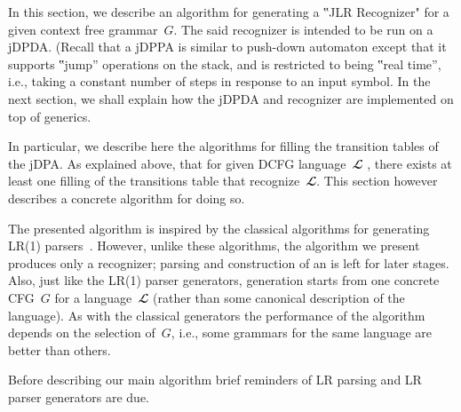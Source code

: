 In this section, we describe an algorithm for generating
  a ‟JLR Recognizer" for a given context free grammar~$G$.
The said recognizer is intended to be run on a jDPDA.
(Recall that a jDPPA is similar to push-down automaton except that it supports 
  ‟jump” operations on the stack, and is restricted to being ‟real time”, i.e.,
  taking a constant number of steps in response
  to an input symbol.
In the next section, we shall explain how the jDPDA and
  recognizer are implemented on top of \Java generics.

In particular, we describe here the algorithms for filling
  the transition tables of the jDPA.
As explained above, that for given DCFG language~$𝓛$ ,
  there exists at least one filling of the transitions table
  that recognize~$𝓛$.
This section however describes a concrete algorithm for
doing so. 

The presented algorithm is inspired by the classical algorithms for generating
  LR(1) parsers~\cite{family1,family2....}.
However, unlike these algorithms, the algorithm we present
  produces only a recognizer; parsing and construction of an \AST
  is left for later stages.
Also, just like the LR(1) parser generators, generation starts from
  one concrete CFG~$G$ for a language~$𝓛$
  (rather than some canonical description of the language).
As with the classical generators the performance of the algorithm
  depends on the selection of~$G$, i.e., some grammars for the same language
  are better than others.

Before describing our main algorithm brief reminders of LR parsing and
  LR parser generators are due.
